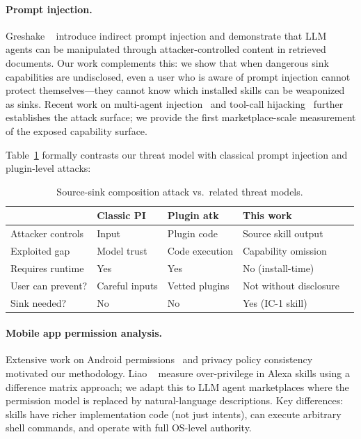 
\paragraph{Prompt injection.}
Greshake \etal~\cite{greshake2023indirect} introduce indirect prompt injection
and demonstrate that LLM agents can be manipulated through
attacker-controlled content in retrieved documents.
Our work complements this: we show that when dangerous sink capabilities
are undisclosed, even a user who is aware of prompt injection
cannot protect themselves---they cannot know which installed skills
can be weaponized as sinks.
Recent work on multi-agent injection~\cite{wu2024autogen}
and tool-call hijacking~\cite{debenedetti2024agentdojo}
further establishes the attack surface; we provide the first
marketplace-scale measurement of the exposed capability surface.

Table~\ref{tab:injection_comparison} formally contrasts our threat model
with classical prompt injection and plugin-level attacks:

\begin{table}[h]
\centering
\caption{Source-sink composition attack vs.\ related threat models.}
\label{tab:injection_comparison}
\scriptsize
\setlength{\tabcolsep}{3pt}
\begin{tabular}{lllll}
\toprule
 & \textbf{Classic PI} & \textbf{Plugin atk} & \textbf{This work} \\
\midrule
Attacker controls & Input & Plugin code & Source skill output \\
Exploited gap & Model trust & Code execution & Capability omission \\
Requires runtime & Yes & Yes & No (install-time) \\
User can prevent? & Careful inputs & Vetted plugins & Not without disclosure \\
Sink needed? & No & No & Yes (IC-1 skill) \\
\bottomrule
\end{tabular}
\end{table}

\paragraph{Mobile app permission analysis.}
Extensive work on Android permissions~\cite{felt2011android,au2012pscout}
and privacy policy consistency~\cite{andow2019policylint,bui2021consistency}
motivated our methodology.
Liao \etal~\cite{liao2020measuring} measure over-privilege in Alexa skills
using a difference matrix approach; we adapt this to LLM agent marketplaces
where the permission model is replaced by natural-language descriptions.
Key differences: skills have richer implementation code (not just intents),
can execute arbitrary shell commands, and operate with full OS-level authority.

